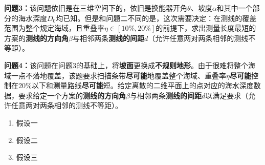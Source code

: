 \textbf{问题3：}该问题依旧是在三维空间下的，依旧是换能器开角$\theta$、坡度$\alpha$和其中一个部分的海水深度$D_0$均已知。但是和问题二不同的是，这次需要决定：在测线的覆盖范围为整个规定海域，且重叠率$\eta \in [10\%, 20\%]$的前提下，求出测量长度最短的方案的\textbf{测线的方向角}$\beta$与相邻两条\textbf{测线的间距}$d$（允许任意两对两条相邻的测线不等距）。

\textbf{问题4：}该问题在问题3的基础上，将\textbf{坡面}更换成\textbf{不规则地形}。由于很难将整个海域一点不落地覆盖，该题要求扫描条带\textbf{尽可能}地覆盖整个海域、重叠率$\eta$\textbf{尽可能}控制在$20\%$以下和测量路线\textbf{尽可能}短。给定离散的二维平面上的点对应的海水深度数据，要求给定一个方案的\textbf{测线的方向角}$\beta$与相邻两条\textbf{测线的间距}$d$以满足要求（允许任意两对两条相邻的测线不等距）。







\begin{enumerate}
    \item 假设一
    \item 假设二
    \item 假设三
\end{enumerate}




